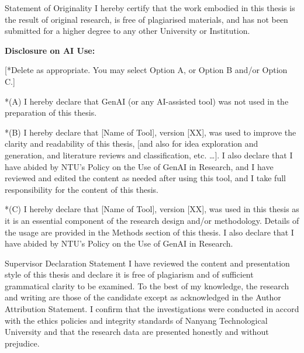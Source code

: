 \documentclass[12pt,a4paper,oneside]{report}
\begin{document}
\makeCEEcover 
\CEEfrontmatter

\begin{CEEdeclaration}{Statement of Originality}
I hereby certify that the work embodied in this thesis is the result of original research, is free of plagiarised materials, and has not been submitted for a higher degree to any other University or Institution.

\textbf{Disclosure on AI Use:}

[*Delete as appropriate. You may select Option A, or Option B and/or Option C.]

*(A) I hereby declare that GenAI (or any AI-assisted tool) was not used in the preparation of this thesis.

*(B) I hereby declare that [Name of Tool], version [XX], was used to improve the clarity and readability of this thesis, [and also for idea exploration and generation, and literature reviews and classification, etc. …]. I also declare that I have abided by NTU’s Policy on the Use of GenAI in Research, and I have reviewed and edited the content as needed after using this tool, and I take full responsibility for the content of this thesis.

*(C) I hereby declare that [Name of Tool], version [XX], was used in this thesis as it is an essential component of the research design and/or methodology. Details of the usage are provided in the Methods section of this thesis. I also declare that I have abided by NTU’s Policy on the Use of GenAI in Research.

\end{CEEdeclaration}

\begin{CEEdeclaration}{Supervisor Declaration Statement}
I have reviewed the content and presentation style of this thesis and declare it is free of plagiarism and of sufficient grammatical clarity to be examined.  To the best of my knowledge, the research and writing are those of the candidate except as acknowledged in the Author Attribution Statement. I confirm that the investigations were conducted in accord with the ethics policies and integrity standards of Nanyang Technological University and that the research data are presented honestly and without prejudice.

\end{CEEdeclaration}
\end{document}
